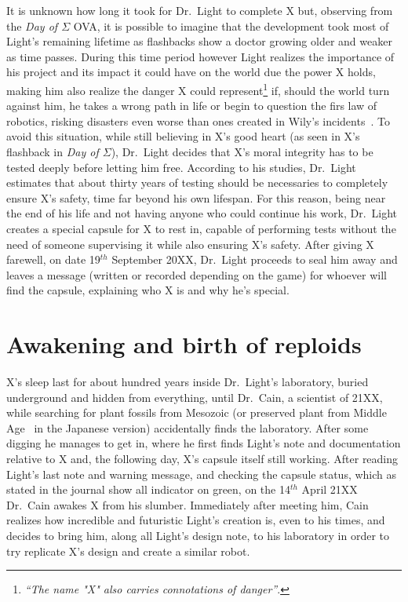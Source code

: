 It is unknown how long it took for Dr.~Light to complete X but, observing from the \emph{Day of $\Sigma$} OVA, it is possible to imagine that the development took most of Light's remaining lifetime as flashbacks show a doctor growing older and weaker as time passes.  During this time period however Light realizes the importance of his project and its impact it could have on the world due the power X holds, making him also realize the danger X could represent\footnote{\textit{``The name "X" also carries connotations of danger''}.} if, should the world turn against him, he takes a wrong path in life or begin to question the firs law of robotics, risking disasters even worse than ones created in Wily's incidents~\cite{elysium_light_warning}. To avoid this situation, while still believing in X's good heart (as seen in X's flashback in \emph{Day of $\Sigma$}), Dr.~Light decides that X's moral integrity has to be tested deeply before letting him free. According to his studies, Dr.~Light estimates that about thirty years of testing should be necessaries to completely ensure X's safety, time far beyond his own lifespan. For this reason, being near the end of his life and not having anyone who could continue his work, Dr.~Light creates a special capsule for X to rest in, capable of performing tests without the need of someone supervising it while also ensuring X's safety. After giving X farewell, on date 19$^{th}$ September 20XX, Dr.~Light proceeds to seal him away and leaves a message (written or recorded depending on the game) for whoever will find the capsule, explaining who X is and why he's special.

\section{Awakening and birth of reploids}
X's sleep last for about hundred years inside Dr.~Light's laboratory, buried underground and hidden from everything, until Dr.~Cain, a scientist of 21XX, while searching for plant fossils  from Mesozoic (or preserved plant from Middle Age~\cite{elysium_Cain_journal} in the Japanese version) accidentally finds the laboratory. After some digging he manages to get in, where he first finds Light's note and documentation relative to X and, the following day, X's capsule itself still working. After reading Light's last note and warning message, and checking the capsule status, which as stated in the journal show all indicator on green, on the 14$^{th}$ April 21XX Dr.~Cain awakes X from his slumber. Immediately after meeting him, Cain realizes how incredible and futuristic Light's creation is, even to his times, and decides to bring him, along all Light's design note, to his laboratory in order to try replicate X's design and create a similar robot.

